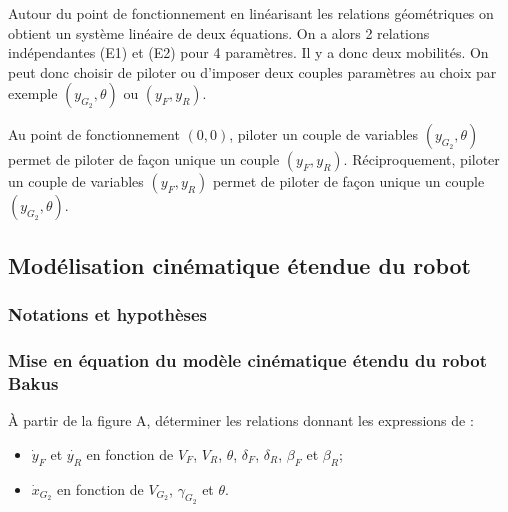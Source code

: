 \documentclass[11pt]{article}
\begin{document}
\begin{UPSTIcorrige}
Autour du point de fonctionnement en linéarisant les relations géométriques on obtient un système linéaire de deux équations. On a alors 2 relations indépendantes (E1) et (E2) pour 4 paramètres. Il y a donc deux mobilités. On peut donc choisir de piloter ou d'imposer deux couples paramètres au choix par exemple  $\left (y_{G_2},\theta \right)$ ou $\left(y_F,y_R\right)$.

Au point de fonctionnement $\left(0,0\right)$, piloter un couple de variables $\left (y_{G_2},\theta \right)$ permet de piloter de façon unique un couple $\left(y_F,y_R\right)$. Réciproquement, piloter un couple de variables $\left(y_F,y_R\right)$ permet de piloter de façon unique un couple $\left (y_{G_2},\theta \right)$.

\end{UPSTIcorrige}


\subsection{Modélisation cinématique étendue du robot}



\subsubsection{Notations et hypothèses}

\subsubsection{Mise en équation du modèle cinématique étendu du robot Bakus}

\UPSTIquestion* À partir de la figure A, déterminer les relations donnant les expressions de :
\begin{itemize}
\item $\dot{y}_F$ et $\dot{y_R}$ en fonction de $V_F$, $V_R$, $\theta$, $\delta_F$, $\delta_R$, $\beta_F$ et $\beta_R$;
\item $\dot{x}_{G_2}$ en fonction de $V_{G_2}$, $\gamma_{G_2}$ et $\theta$.
\end{itemize}
\end{document}

